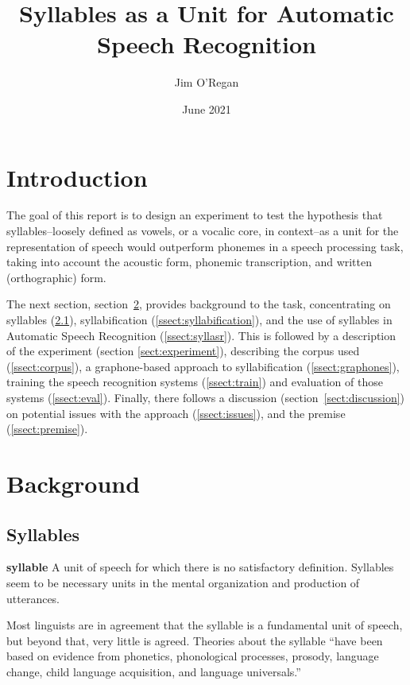 \documentclass{article}[11pt]
\title{Syllables as a Unit for Automatic Speech Recognition}
\author{Jim O'Regan}
\date{June 2021}
\begin{document}
\maketitle

\section{Introduction}
\label{sect:intro}

The goal of this report is to design an experiment to test the hypothesis that syllables--loosely defined as vowels, or a vocalic core, in context--as a unit for the representation of speech would outperform phonemes in a speech processing task, taking into account the acoustic form, phonemic transcription, and written (orthographic) form.

The next section, section~\ref{sect:bg}, provides background to the task, concentrating on syllables (\ref{ssect:syllables}), syllabification (\ref{ssect:syllabification}), and the use of syllables in Automatic Speech Recognition (\ref{ssect:syllasr}). This is followed by a description of the experiment (section \ref{sect:experiment}), describing the corpus used (\ref{ssect:corpus}), a graphone-based approach to syllabification (\ref{ssect:graphones}), training the speech recognition systems (\ref{ssect:train}) and evaluation of those systems (\ref{ssect:eval}). Finally, there follows a discussion (section~\ref{sect:discussion}) on potential issues with the approach (\ref{ssect:issues}), and the premise (\ref{ssect:premise}).

\section{Background}
\label{sect:bg}

\subsection{Syllables}
\label{ssect:syllables}

\begin{displayquote}
\textbf{syllable} A unit of speech for which there is
no satisfactory definition. Syllables seem to
be necessary units in the mental organization and production of utterances.~\citep{ladefoged_course_2011}
\end{displayquote}

Most linguists are in agreement that the syllable is a fundamental unit of speech, but beyond that, very little is agreed. Theories about the syllable ``have been based on evidence from phonetics, phonological processes, prosody, language change, child language acquisition, and language universals.''~\citep{fallows_experimental_1981}
\end{document}
